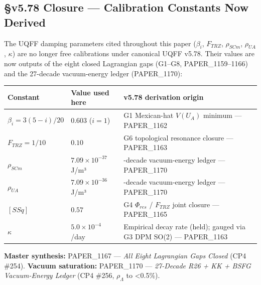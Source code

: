 \documentclass[
  11pt,
]{article}
\newcounter{none} %
\begin{document}
\subsection{§v5.78 Closure --- Calibration Constants Now
Derived}\label{v5.78-closure-calibration-constants-now-derived}

The UQFF damping parameters cited throughout this paper ($\beta_i$,
$F_{TRZ}$, $\rho_{SCm}$, $\rho_{UA}$, $\kappa$) are no longer
free calibrations under canonical UQFF v5.78. Their values are now
outputs of the eight closed Lagrangian gaps (G1--G8, PAPER\_1159--1166)
and the 27-decade vacuum-energy ledger (PAPER\_1170):

{\def\LTcaptype{none} %
\begin{longtable}[]{@{}
  >{\raggedright\arraybackslash}p{}
  >{\raggedright\arraybackslash}p{}
  >{\raggedright\arraybackslash}p{}@{}}
\toprule\noalign{}
\begin{minipage}[b]{\linewidth}\raggedright
Constant
\end{minipage} & \begin{minipage}[b]{\linewidth}\raggedright
Value used here
\end{minipage} & \begin{minipage}[b]{\linewidth}\raggedright
v5.78 derivation origin
\end{minipage} \\
\midrule\noalign{}
\endhead
\bottomrule\noalign{}
\endlastfoot
$\beta_i = 3(5-i)/20$ & $0.603$ ($i=1$) & G1 Mexican-hat
$V(U_A)$ minimum --- PAPER\_1162 \\
$F_{TRZ} = 1/10$ & $0.10$ & G6 topological resonance closure ---
PAPER\_1163 \\
$\rho_{SCm}$ & $7.09\times10^{-37}$ J/m³ & 27-decade vacuum-energy
ledger --- PAPER\_1170 \\
$\rho_{UA}$ & $7.09\times10^{-36}$ J/m³ & 27-decade vacuum-energy
ledger --- PAPER\_1170 \\
$[SSq]$ & $0.57$ & G4 $\Phi_{res}$ / $F_{TRZ}$ joint closure ---
PAPER\_1165 \\
$\kappa$ & $5.0\times10^{-4}$ /day & Empirical decay rate (held);
gauged via G3 DPM SO(2) --- PAPER\_1163 \\
\end{longtable}
}

\textbf{Master synthesis:} PAPER\_1167 --- \emph{All Eight Lagrangian
Gaps Closed} (CP4 \#254). \textbf{Vacuum saturation:} PAPER\_1170 ---
\emph{27-Decade R26 + KK + BSFG Vacuum-Energy Ledger} (CP4 \#256,
$\rho_\Lambda$ to \textless0.5\%).
\end{document}
